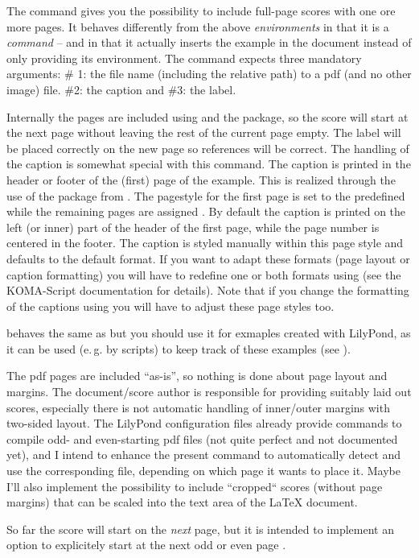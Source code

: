 \documentclass[../openLilyLib]{subfiles}
\begin{document}
The  command gives you the possibility to include full-page scores with one ore more pages.
It behaves differently from the above \emph{environments} in that it is a \emph{command} -- and in that it actually inserts the example in the document instead of only providing its environment.
The command expects three mandatory arguments: 
\# 1: the file name (including the relative path) to a pdf (and no other image) file.
\#2: the caption and \#3: the label.

Internally the pages are included using  and the  package, so the score will start at the next page without leaving the rest of the current page empty.
The label will be placed correctly on the new page so references will be correct.
The handling of the caption is somewhat special with this command.
The caption is printed in the header or footer of the (first) page of the example.
This is realized through the use of the  package from .
The pagestyle for the first page is set to the predefined  while the remaining pages are assigned .
By default the caption is printed on the left (or inner) part of the header of the first page, while the page number is centered in the footer.
The caption is styled manually within this page style and defaults to the default  format.
If you want to adapt these formats (page layout or caption formatting) you will have to redefine one or both formats using  (see the KOMA-Script documentation for details).
Note that if you change the formatting of the captions using  you will have to adjust these page styles too.

 behaves the same as  but you should use it for exmaples created with LilyPond, as it can be used (e.\,g. by scripts) to keep track of these examples (see ).

\begin{knownIssues}
The pdf pages are included “as-is”, so nothing is done about page layout and margins.
The document/score author is responsible for providing suitably laid out scores, especially there is not automatic handling of inner/outer margins with two-sided layout.
The LilyPond configuration files already provide commands to compile odd- and even-starting pdf files (not quite perfect and not documented yet), and I intend to enhance the present command to automatically detect and use the corresponding file, depending on which page it wants to place it.
Maybe I'll also implement the possibility to include “cropped“ scores (without page margins) that can be scaled into the text area of the \LaTeX{} document.

So far the score will start on the \emph{next} page, but it is intended to implement an option to explicitely start at the next odd or even page .
\end{knownIssues}
\end{document}
